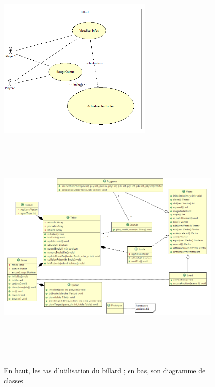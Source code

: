 \begin{figure}[h]
 \centering
 \includegraphics[height=7cm]{../umls/UML_images/Billard/utilisation} \hfill
 \includegraphics[width=\textwidth,height=12cm]{../umls/UML_images/Billard/class} \hfill
 \caption{En haut, les cas d'utilisation du billard ; en bas, son diagramme de classes}
\end{figure}

